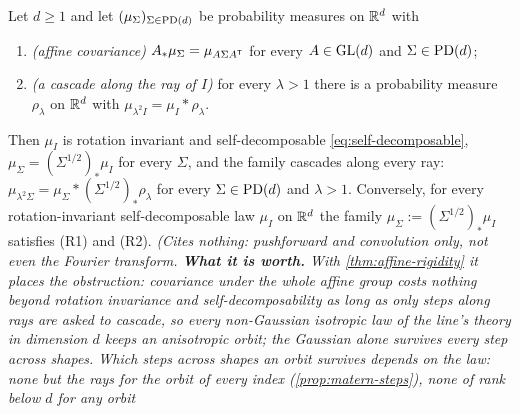 \begin{proposition}
\label{prop:ray-families}
\leanok
Let $d \ge 1$ and let $(\mu_\Sigma)_{\Sigma\in\mathrm{PD}(d)}$ be probability measures on $\mathbb{R}^d$ with
\begin{enumerate}
\item[(R1)] \emph{(affine covariance)} $A_*\mu_\Sigma = \mu_{A\Sigma A^{\mathsf{T}}}$ for every
$A \in \mathrm{GL}(d)$ and $\Sigma \in \mathrm{PD}(d)$;
\item[(R2)] \emph{(a cascade along the ray of $I$)} for every $\lambda > 1$ there is a probability
measure $\rho_\lambda$ on $\mathbb{R}^d$ with $\mu_{\lambda^2I} = \mu_I * \rho_\lambda$.
\end{enumerate}
Then $\mu_I$ is rotation invariant and self-decomposable \ref{eq:self-decomposable},
$\mu_\Sigma = (\Sigma^{1/2})_*\mu_I$ for every $\Sigma$, and the family cascades along every ray:
$\mu_{\lambda^2\Sigma} = \mu_\Sigma * (\Sigma^{1/2})_*\rho_\lambda$ for every $\Sigma \in \mathrm{PD}(d)$
and $\lambda > 1$. Conversely, for every rotation-invariant self-decomposable law $\mu_I$ on
$\mathbb{R}^d$ the family $\mu_\Sigma := (\Sigma^{1/2})_*\mu_I$ satisfies (R1) and (R2).
\statusT\quad\emph{(Cites nothing: pushforward and convolution only, not even the Fourier
transform. \textbf{What it is worth.} With \ref{thm:affine-rigidity} it places the obstruction:
covariance under the whole affine group costs nothing beyond rotation invariance and
self-decomposability as long as only steps along rays are asked to cascade, so every
non-Gaussian isotropic law of the line's theory in dimension $d$ keeps an anisotropic orbit;
the Gaussian alone survives every step across shapes. Which steps across shapes an orbit
survives depends on the law: none but the rays for the \Matern{} orbit of every index
(\ref{prop:matern-steps}), none of rank below $d$ for any orbit
}
\end{proposition}
